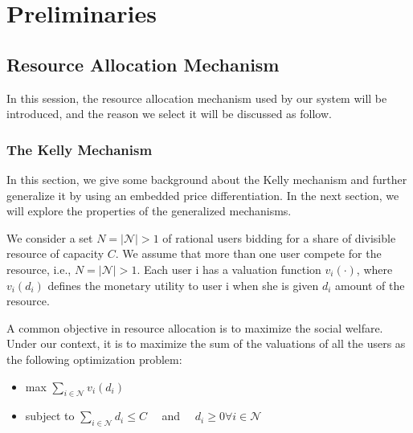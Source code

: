 \chapter{Preliminaries}
\label{chp:chap-two}

\section{Resource Allocation Mechanism}

In this session, the resource allocation mechanism used by our system will be introduced, and the reason we select it will be discussed as follow\cite{yang_price_2013}.

\subsection{The Kelly Mechanism}

In this section, we give some background about the Kelly mechanism and further generalize it by using an embedded price differentiation. In the next section, we will explore the properties of the generalized mechanisms.

We consider a set $N=|\mathscr{N}|>1$ of rational users bidding for a share of divisible resource of capacity $C$. We assume that more than one user compete for the resource, i.e., $N=|\mathscr{N}|>1$. Each user i has a valuation function $v_{i}(\cdot)$, where $v_{i}\left(d_{i}\right)$ defines the monetary utility to user i when she is given $d_{i}$ amount of the resource.

A common objective in resource allocation is to maximize the social welfare. Under our context, it is to maximize the sum of the valuations of all the users as the following optimization problem:

\begin{itemize}
\item max           $\sum_{i \in \mathcal{N}} v_{i}\left(d_{i}\right)$
\item subject to    $\sum_{i \in \mathcal{N}} d_{i} \leq C \quad$ and $\quad d_{i} \geq 0 \forall i \in \mathcal{N}$
\end{itemize}

